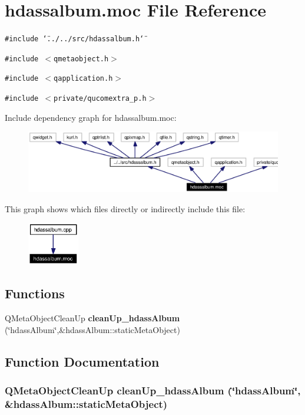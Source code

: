 \section{hdassalbum.moc File Reference}
\label{hdassalbum_8moc}


{\tt \#include \char`\"{}../../src/hdassalbum.h\char`\"{}}\par
{\tt \#include $<$qmetaobject.h$>$}\par
{\tt \#include $<$qapplication.h$>$}\par
{\tt \#include $<$private/qucomextra\_\-p.h$>$}\par


Include dependency graph for hdassalbum.moc:\begin{figure}[H]
\begin{center}
\leavevmode
\includegraphics[width=331pt]{hdassalbum_8moc__incl}
\end{center}
\end{figure}


This graph shows which files directly or indirectly include this file:\begin{figure}[H]
\begin{center}
\leavevmode
\includegraphics[width=64pt]{hdassalbum_8moc__dep__incl}
\end{center}
\end{figure}
\subsection*{Functions}
\begin{CompactItemize}
\item 
QMeta\-Object\-Clean\-Up {\bf clean\-Up\_\-hdass\-Album} (\char`\"{}hdass\-Album\char`\"{},\&hdass\-Album::static\-Meta\-Object)
\end{CompactItemize}


\subsection{Function Documentation}
\subsubsection{\setlength{\rightskip}{0pt plus 5cm}QMeta\-Object\-Clean\-Up clean\-Up\_\-hdass\-Album (\char`\"{}hdass\-Album\char`\"{}, \&hdass\-Album::static\-Meta\-Object)\hspace{0.3cm}{\tt  [static]}}\label{hdassalbum_8moc_a0}


